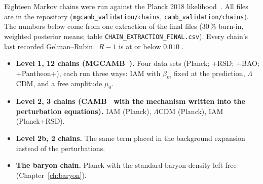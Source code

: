 Eighteen Markov chains were run against the Planck 2018 likelihood~\cite{Planck2018V}. All files are in the repository
(\texttt{mgcamb\_validation/\allowbreak{}chains}, \texttt{camb\_validation/\allowbreak{}chains}). The numbers below come from one extraction of the final files
(30\,\% burn-in, weighted posterior means; table \texttt{CHAIN\_EXTRACTION\_FINAL.csv}). Every chain's last recorded Gelman--Rubin~\cite{Gelman1992}
$R-1$ is at or below $0.010$ \measured.

\begin{itemize}
 \item \textbf{Level 1, 12 chains (MGCAMB~\cite{Zhao2009MGCAMB,Wang2023MGCAMB}).} Four data sets (Planck; +RSD; +BAO; +Pantheon+), each run three ways: IAM with
       $\beta_m$ fixed at the prediction, $\Lambda$CDM, and a free amplitude $\mu_0$.
 \item \textbf{Level 2, 3 chains (CAMB~\cite{Lewis2000CAMB} with the mechanism written into the perturbation equations).} IAM (Planck), $\Lambda$CDM (Planck), IAM (Planck+RSD).
 \item \textbf{Level 2b, 2 chains.} The same term placed in the background expansion instead of the perturbations.
 \item \textbf{The baryon chain.} Planck with the standard baryon density left free (Chapter~\ref{ch:baryon}).
\end{itemize}

